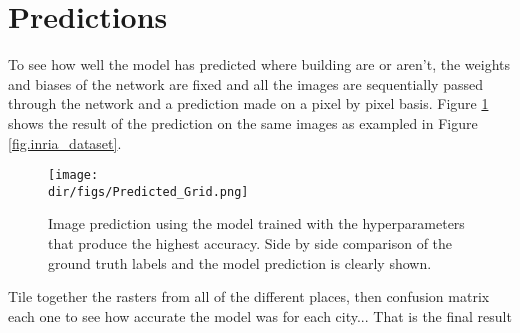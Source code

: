 \section{Predictions}
To see how well the model has predicted where building are or aren't, the weights and biases of the network are fixed and all the images are sequentially passed through the network and a prediction made on a pixel by pixel basis. Figure \ref{fig.prediction} shows the result of the prediction on the same images as exampled in Figure \ref{fig.inria_dataset}. 

\begin{figure}[htpb]
    \centering
    \texttt{[image: \\dir/figs/Predicted\_Grid.png]}
    \caption[Image Prediction using the model with the best accuracy]{Image prediction using the model trained with the hyperparameters that produce the highest accuracy. Side by side comparison of the ground truth labels and the model prediction is clearly shown.}
    \label{fig.prediction}
\end{figure}

Tile together the rasters from all of the different places, then confusion matrix each one to see how accurate the model was for each city... That is the final result
